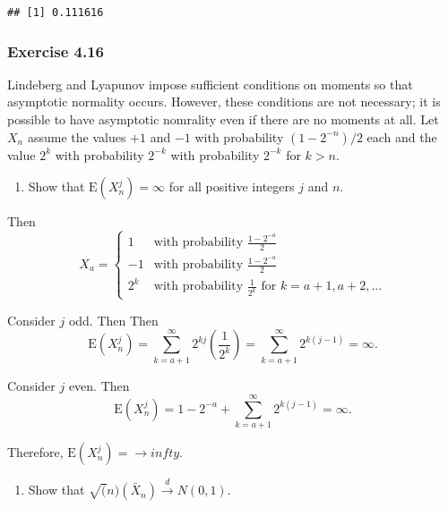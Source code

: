 \documentclass[12pt,]{article}
\providecommand{\tightlist}{%
  \setlength{\itemsep}{0pt}\setlength{\parskip}{0pt}}
\begin{document}
\begin{verbatim}
## [1] 0.111616
\end{verbatim}

\hypertarget{exercise-4.16}{%
\subsubsection{Exercise 4.16}\label{exercise-4.16}}

Lindeberg and Lyapunov impose sufficient conditions on moments so that
asymptotic normality occurs. However, these conditions are not
necessary; it is possible to have asymptotic nomrality even if there are
no moments at all. Let \(X_n\) assume the values \(+1\) and \(-1\) with
probability \((1-2^{-n})/2\) each and the value \(2^k\) with probability
\(2^{-k}\) with probability \(2^{-k}\) for \(k>n.\)

\begin{enumerate}
\def\labelenumi{(\alph{enumi})}
\tightlist
\item
  Show that \(\text{E}(X_n^j) = \infty\) for all positive integers \(j\)
  and \(n\).
\end{enumerate}

Then \[X_a=\begin{cases}
1 &\text{with probability } \frac{1-2^{-a}}{2}\\
-1 &\text{with probability } \frac{1-2^{-a}}{2}\\
2^k &\text{with probability } \frac{1}{2^k} \text{ for } k = a+1, a+2,...
\end{cases}
\]

Consider \(j\) odd. Then Then
\[\text{E}(X_n^j) = \sum_{k=a+1}^\infty 2^{kj}\left(\frac{1}{2^k}\right)=\sum_{k=a+1}^\infty 2^{k(j-1)}=\infty.\]

Consider \(j\) even. Then
\[\text{E}(X_n^j) =1-2^{-a}+\sum_{k=a+1}^\infty 2^{k(j-1)}=\infty.\]

Therefore, \(\text{E}(X_n^j) = \rightarrow infty\).

\begin{enumerate}
\def\labelenumi{(\alph{enumi})}
\setcounter{enumi}{1}
\tightlist
\item
  Show that \(\sqrt(n)(\bar X_n) \overset{d}\rightarrow N(0,1).\)
\end{enumerate}
\end{document}
